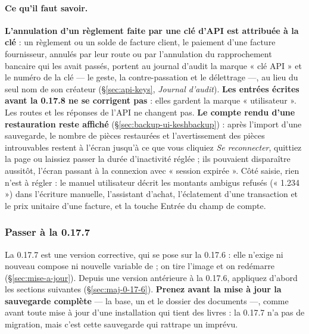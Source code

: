 \documentclass[a4paper,11pt,oneside]{article}
\begin{document}
\paragraph{Ce qu'il faut savoir.} \textbf{L'annulation d'un règlement faite par une clé d'API est attribuée à la clé} : un règlement ou un solde de facture client, le paiement d'une facture fournisseur, annulés par leur route ou par l'annulation du rapprochement bancaire qui les avait passés, portent au journal d'audit la marque « clé API » et le numéro de la clé --- le geste, la contre-passation et le délettrage ---, au lieu du seul nom de son créateur (\S\ref{sec:api-keys}, \emph{Journal d'audit}). \textbf{Les entrées écrites avant la 0.17.8 ne se corrigent pas} : elles gardent la marque « utilisateur ». Les routes et les réponses de l'API ne changent pas. \textbf{Le compte rendu d'une restauration reste affiché} (\S\ref{sec:backup-ui-keshbackup}) : après l'import d'une sauvegarde, le nombre de pièces restaurées et l'avertissement des pièces introuvables restent à l'écran jusqu'à ce que vous cliquiez \emph{Se reconnecter}, quittiez la page ou laissiez passer la durée d'inactivité réglée ; ils pouvaient disparaître aussitôt, l'écran passant à la connexion avec « session expirée ». Côté saisie, rien n'est à régler : le manuel utilisateur décrit les montants ambigus refusés (« 1.234 ») dans l'écriture manuelle, l'assistant d'achat, l'éclatement d'une transaction et le prix unitaire d'une facture, et la touche Entrée du champ de compte.

\fussy

\subsubsection{Passer à la 0.17.7}\label{sec:maj-0-17-7}
\sloppy

La 0.17.7 est une version corrective, qui se pose sur la 0.17.6 : elle n'exige ni nouveau compose ni nouvelle variable de  ; on tire l'image et on redémarre (\S\ref{sec:mise-a-jour}). Depuis une version antérieure à la 0.17.6, appliquez d'abord les sections suivantes (\S\ref{sec:maj-0-17-6}). \textbf{Prenez avant la mise à jour la sauvegarde complète} --- la base, un  et le dossier des documents ---, comme avant toute mise à jour d'une installation qui tient des livres : la 0.17.7 n'a pas de migration, mais c'est cette sauvegarde qui rattrape un imprévu.
\end{document}
